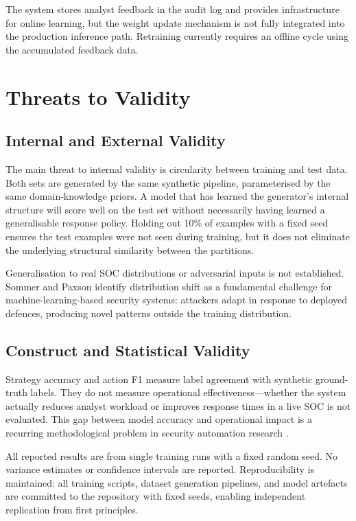 The system stores analyst feedback in the audit log and provides infrastructure for online learning, but the weight update mechanism is not fully integrated into the production inference path. Retraining currently requires an offline cycle using the accumulated feedback data.

\section{Threats to Validity}
\label{sec:discussion-threats}

\subsection{Internal and External Validity}

The main threat to internal validity is circularity between training and test data. Both sets are generated by the same synthetic pipeline, parameterised by the same domain-knowledge priors. A model that has learned the generator's internal structure will score well on the test set without necessarily having learned a generalisable response policy. Holding out 10\% of examples with a fixed seed ensures the test examples were not seen during training, but it does not eliminate the underlying structural similarity between the partitions.

Generalisation to real SOC distributions or adversarial inputs is not established. Sommer and Paxson \cite{sommer2010outside} identify distribution shift as a fundamental challenge for machine-learning-based security systems: attackers adapt in response to deployed defences, producing novel patterns outside the training distribution.

\subsection{Construct and Statistical Validity}

Strategy accuracy and action F1 measure label agreement with synthetic ground-truth labels. They do not measure operational effectiveness---whether the system actually reduces analyst workload or improves response times in a live SOC is not evaluated. This gap between model accuracy and operational impact is a recurring methodological problem in security automation research \cite{tilbury2024humans, ban2023alertfatigue}.

All reported results are from single training runs with a fixed random seed. No variance estimates or confidence intervals are reported. Reproducibility is maintained: all training scripts, dataset generation pipelines, and model artefacts are committed to the repository with fixed seeds, enabling independent replication from first principles.
